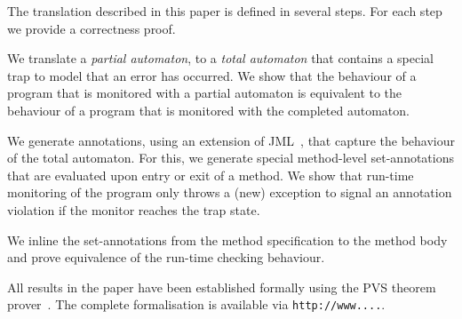 The translation described in this paper is defined in several
steps. For each step we provide a correctness proof.
\begin{inparaenum}
\item We translate a \emph{partial automaton}, to a \emph{total automaton}
that contains a special trap to model that an error has occurred.
We show that the behaviour of a program that is monitored with a partial
automaton is equivalent to the behaviour of a program that is monitored with
the completed automaton.
\item We generate annotations, using an extension of JML~\cite{LeavensPCCRCK05},
that capture the behaviour of the total automaton.  For this, we
generate special method-level set-annotations that are evaluated upon
entry or exit of a method.
We show that run-time monitoring of the program only throws a (new) exception
to signal an annotation violation if the monitor reaches the trap state.
\item We inline the set-annotations from the method specification
to the method body and prove equivalence of the run-time checking behaviour.
\end{inparaenum}
All results in the paper have been established formally using
the PVS theorem prover~\cite{OwreRRSS96}. The complete formalisation
is available via \texttt{http://www....}.


